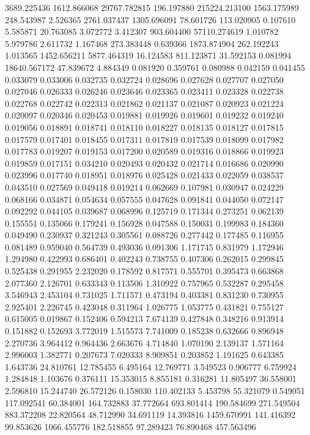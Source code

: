 3689.225436
1612.866068
29767.782815
196.197880
215224.213100
1563.175989
248.543987
2.526365
2761.037437
1305.696091
78.601726
113.020905
0.107610
5.585871
20.763085
3.072772
3.412307
903.604400
57110.274619
1.010782
5.979786
2.611732
1.167468
273.383448
0.639366
1873.874904
262.192243
1.013565
1452.656211
5877.464319
16.124583
811.123871
31.592153
0.081994
18640.567172
47.839672
4.884349
0.081920
0.359761
0.080988
0.042159
0.041455
0.033079
0.033006
0.032735
0.032724
0.028696
0.027628
0.027707
0.027050
0.027046
0.026333
0.026246
0.023646
0.023365
0.023411
0.023328
0.022738
0.022768
0.022742
0.022313
0.021862
0.021137
0.021087
0.020923
0.021224
0.020097
0.020346
0.020453
0.019881
0.019926
0.019601
0.019232
0.019240
0.019056
0.018891
0.018741
0.018110
0.018227
0.018135
0.018127
0.017815
0.017579
0.017401
0.018455
0.017311
0.017819
0.017539
0.018099
0.017982
0.017783
0.019207
0.019153
0.017200
0.020589
0.019316
0.018866
0.019923
0.019859
0.017151
0.034210
0.020493
0.020432
0.021714
0.016686
0.020990
0.023996
0.017740
0.018951
0.018976
0.025428
0.021433
0.022059
0.038537
0.043510
0.027569
0.049418
0.019214
0.062669
0.107981
0.030947
0.024229
0.068166
0.034871
0.054634
0.057555
0.047628
0.091841
0.044050
0.072147
0.092292
0.044105
0.039687
0.068996
0.125719
0.171344
0.273251
0.062139
0.155551
0.135066
0.179241
0.156928
0.047588
0.150031
0.199983
0.184360
0.049490
0.230937
0.321243
0.305561
0.088726
0.277442
0.177485
0.116955
0.081489
0.959040
0.564739
0.493036
0.091306
1.171745
0.831979
1.172946
1.294980
0.422993
0.686401
0.402243
0.738755
0.407306
0.262015
0.299845
0.525438
0.291955
2.232020
0.178592
0.817571
0.555701
0.395473
0.663868
2.077360
2.126701
0.633343
0.113506
1.310922
0.757965
0.532287
0.295458
3.546943
2.453104
0.731025
1.711571
0.473194
0.403381
0.831230
0.730955
2.925401
2.226745
0.423048
0.311964
1.026775
1.053775
0.431821
0.755127
0.615005
0.019867
0.152406
0.594213
7.674139
0.427848
0.348216
0.913914
0.151882
0.152693
3.772019
1.515573
7.741009
0.185238
0.632666
0.896948
2.270736
3.964412
0.964436
2.663676
4.714840
1.070190
2.139137
1.571164
2.996003
1.382771
0.207673
7.020333
8.909851
0.203852
1.191625
0.643385
1.643736
24.810761
12.785455
6.495164
12.769771
3.549523
0.906777
6.759924
1.284848
1.103676
0.376111
15.353015
8.855181
0.316281
11.805497
36.558001
2.596810
15.244740
26.572126
0.158030
110.402133
5.453798
55.321079
0.549051
117.092541
60.384001
164.732883
37.772664
693.801414
190.584699
271.549504
883.372208
22.820564
48.712990
34.691119
14.393816
1459.670991
141.416392
99.853626
1066.455776
182.518855
97.289423
76.890468
457.563496
